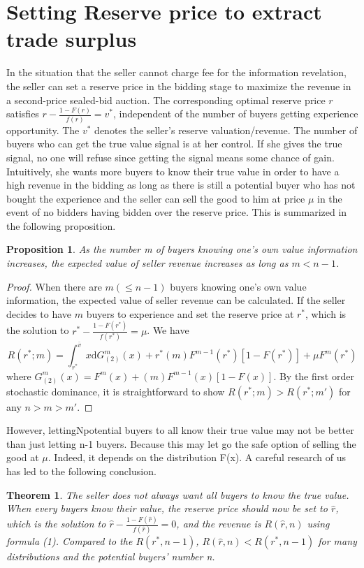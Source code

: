 \documentclass[review]{elsarticle}
\newtheorem{thm}{Theorem}
\newtheorem{prop}{Proposition}
\begin{document}
\section{Setting Reserve price to extract trade surplus}
In the situation that the seller cannot charge fee for the information
revelation,  the seller can set a reserve price in the bidding stage to maximize the
revenue in a second-price sealed-bid auction. The corresponding
optimal reserve price $r$ satisfies $r - \frac{1 - F(r)}{f(r)}
= v^*$, independent of the number of buyers getting experience
opportunity. The $v^*$ denotes the seller's reserve valuation/revenue. 
 The number of buyers who can get the true value signal is at her control. If she gives the true
signal, no one will refuse since getting the signal means some chance
of gain. Intuitively, she 
wants more buyers to know their true value in order to have a high
revenue in the bidding as long as there is still a potential buyer who
has not bought the experience and the seller can sell the good to him
at price $\mu$ in the event of no bidders having bidden over the
reserve price. This is summarized in the following proposition.
\begin{prop}
 As the number m of buyers knowing one's own value information increases, the expected value of seller revenue increases as long as $m<n-1$.
\end{prop}
\begin{proof}
When there are $m(\leq n-1)$ buyers knowing one's own value information, the expected value of seller revenue can be calculated.
If the seller decides to have $m$ buyers to experience and set the
reserve price at $r^*$, which is the solution to $r^*-\frac{1 - F(r^*)}{f(r^*)}=\mu$. We have
\begin{equation}
R(r^* ;m) =  \int_{r^*}^{\overline{v}}x\mathrm{d}G_{(2)}^{m}(x) +
r^*(m)F^{m-1}(r^*)[1 - F(r^*)] + \mu F^{m}(r^*)
\end{equation}
where $G_{(2)}^{m}(x) = F^{m}(x) + (m)F^{m-1}(x)[1 -  F(x)]$.
 By the first order stochastic dominance, it is straightforward to show $R(r^*;m) > R(r^*;m')$ for any $n>m>m'$.
\end{proof}
However, lettingNpotential buyers to all know their true value may
not be better than just letting n-1 buyers. Because this may let go the
safe option of selling the good at $\mu$. Indeed, it depends on the
distribution F(x). A careful research of us has led to the following conclusion.
\begin{thm}
  The seller does not always want all buyers to know the true value. 
 When every buyers know their value, 
 the reserve price should now be set to $\hat{r}$, which is the solution to $\hat{r}-\frac{1 - F(\hat{r})}{f(\hat{r})}=0$, and the revenue is $R(\hat{r},n)$ using formula (1). Compared to the $R(r^*,n-1)$,
 $R(\hat{r},n)<R(r^*,n-1)$ for many distributions and the potential buyers' number n.
 \end{thm}
\end{document}
